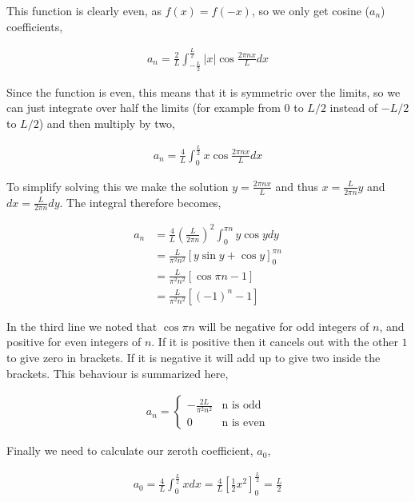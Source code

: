 \documentclass[11pt]{amsart}
\begin{document}
This function is clearly even, as $f(x) = f(-x)$, so we only get cosine ($a_n$) coefficients,

\begin{align*}
  a_n = \frac{2}{L}\int_{-\frac{L}{2}}^{\frac{L}{2}} |x| \cos{\frac{2\pi nx}{L}} dx
\end{align*}

Since the function is even, this means that it is symmetric over the limits, so we can just integrate over half the limits (for example from $0$ to $L/2$ instead of $-L/2$ to $L/2$) and then multiply by two,

\begin{align*}
  a_n = \frac{4}{L}\int_0^{\frac{L}{2}} x\cos{\frac{2\pi nx}{L}} dx
\end{align*}

To simplify solving this we make the solution $y = \frac{2\pi nx}{L}$ and thus $x = \frac{L}{2\pi n} y$ and $dx = \frac{L}{2\pi n}dy$. The integral therefore becomes,

\begin{align*}
  a_n &= \frac{4}{L}{\left(\frac{L}{2\pi n}\right)}^2\int_0^{\pi n} y\cos{y} dy \\
      &= \frac{L}{\pi^2n^2}{\left[y\sin{y}+\cos{y}\right]}_0^{\pi n} \\
      &= \frac{L}{\pi^2n^2}\left[\cos{\pi n} - 1\right] \\
      &= \frac{L}{\pi^2n^2}\left[{(-1)}^n - 1\right]
\end{align*}

In the third line we noted that $\cos{\pi n}$ will be negative for odd integers of $n$, and positive for even integers of $n$. If it is positive then it cancels out with the other $1$ to give zero in brackets. If it is negative it will add up to give two inside the brackets. This behaviour is summarized here,

\begin{align*}
  a_n=
  \begin{cases}
    -\frac{2L}{\pi^2n^2} & \text{n is odd} \\
    0 & \text{n is even}
  \end{cases}
\end{align*}

Finally we need to calculate our zeroth coefficient, $a_0$,

\begin{align*}
  a_0 = \frac{4}{L}\int_0^{\frac{L}{2}} x dx = \frac{4}{L}{\left[\frac{1}{2}x^2\right]}_0^{\frac{L}{2}} = \frac{L}{2}
\end{align*}
\end{document}
